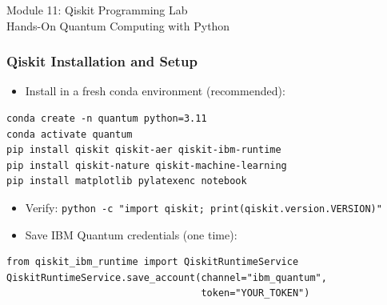 
\begin{frame}[fragile]\frametitle{}
\begin{center}
{\Large Module 11: Qiskit Programming Lab}\\[0.5em]
{\large Hands-On Quantum Computing with Python}
\end{center}
\end{frame}

\begin{frame}[fragile]\frametitle{Qiskit Installation and Setup}
\begin{itemize}
\item Install in a fresh conda environment (recommended):
\end{itemize}
\begin{verbatim}
conda create -n quantum python=3.11
conda activate quantum
pip install qiskit qiskit-aer qiskit-ibm-runtime
pip install qiskit-nature qiskit-machine-learning
pip install matplotlib pylatexenc notebook
\end{verbatim}
\begin{itemize}
\item Verify: \texttt{python -c "import qiskit; print(qiskit.version.VERSION)"}
\item Save IBM Quantum credentials (one time):
\end{itemize}
\begin{verbatim}
from qiskit_ibm_runtime import QiskitRuntimeService
QiskitRuntimeService.save_account(channel="ibm_quantum",
                                  token="YOUR_TOKEN")
\end{verbatim}
\end{frame}

